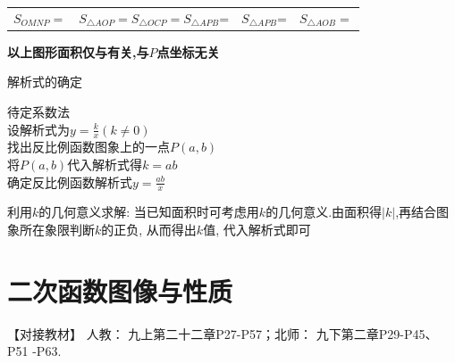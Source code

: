 \documentclass[cn,blue,12pt]{elegantbook}
\renewcommand \tkt[1]{{\CJKunderline[hidden=true, skip=true, thickness=1pt]{#1}}}
\begin{document}
\begin{zsyd}
\begin{table}[H]
\begin{tabular}{|c|c|c|c|}
            \bigstrut\\
            \hline
            \(S_{OMNP}=\)\tkt{\(|x_p|\cdot |y_p|=|k|\)} & \(S_{\triangle AOP}=S_{\triangle OCP}=S_{\triangle APB}\)=\tkt{\(\frac{|k|}{2}\)}     & \(S_{\triangle APB}\)=\tkt{\(2|k|\)}     &\(S_{\triangle AOB}=\)\tkt{\(\frac{1}{2}|k_1-k_2|\)}  \bigstrut\\
            \hline
        \end{tabular}%
    \end{table}%
    \textbf{以上图形面积仅与\tkt{\(k\)}有关,与\(P\)点坐标无关}
\item 解析式的确定
    \begin{zsyd}
    \item 待定系数法\\
        设解析式为\(y=\frac{k}{x}(k\ne 0)\)\\
        找出反比例函数图象上的一点\(P(a,b)\)\\
        将\(P(a,b)\)代入解析式得\(k = ab\)\\
        确定反比例函数解析式\(y=\frac{ab}{x}\)
    \item 利用\(k\)的几何意义求解: 当已知面积时可考虑用\(k\)的几何意义.由面积得\(|k|\),再结合图象所在象限判断\(k\)的正负, 从而得出\(k\)值, 代入解析式即可
    \end{zsyd}
\end{zsyd}

\chapter{二次函数图像与性质}%
\label{cha:二次函数图像与性质}
\begin{note}
    【对接教材】 人教： 九上第二十二章P27-P57；北师： 九下第二章P29-P45、P51 -P63.
\end{note}
\end{document}

